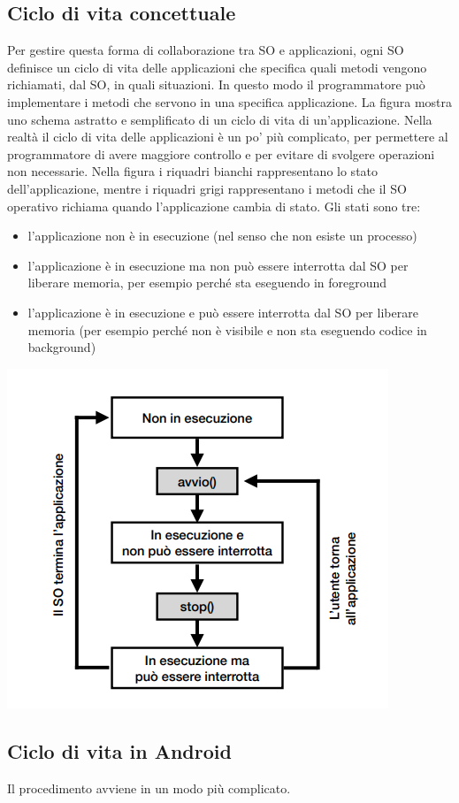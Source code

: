 \subsection{Ciclo di vita concettuale}
Per gestire questa forma di collaborazione tra SO e applicazioni, ogni SO definisce un ciclo di vita delle applicazioni che specifica quali metodi vengono richiamati, dal SO, in quali situazioni. In questo modo il programmatore può implementare i metodi che servono in una specifica applicazione. La figura mostra uno schema astratto e semplificato di un ciclo di vita di un’applicazione. Nella realtà il ciclo di vita delle applicazioni è un po’ più complicato, per permettere al programmatore di avere maggiore controllo e per evitare di svolgere operazioni non necessarie.
Nella figura i riquadri bianchi rappresentano lo stato dell'applicazione, mentre i riquadri grigi rappresentano i metodi che il SO operativo richiama quando l’applicazione cambia di stato. Gli stati sono tre: 
\begin{itemize}
    \item l’applicazione non è in esecuzione (nel senso che non esiste un processo)
    \item l’applicazione è in esecuzione ma non può essere interrotta dal SO per liberare memoria, per esempio perché sta eseguendo in foreground 
    \item l’applicazione è in esecuzione e può essere interrotta dal SO per liberare memoria (per esempio perché non è visibile e non sta eseguendo codice in background)
\end{itemize}
\begin{center}
    \includegraphics[width=.5\textwidth]{images/Mobile computing/2. Sistemi operativi/ciclo di vita.PNG}
\end{center}

\subsection{Ciclo di vita in Android}
Il procedimento avviene in un modo più complicato. 

